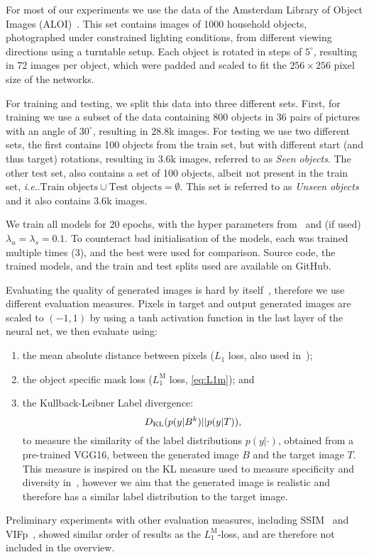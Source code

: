 \documentclass[runningheads]{llncs}
\makeatletter
\DeclareRobustCommand\onedot{\futurelet\@let@token\@onedot}
\def\@onedot{\ifx\@let@token.\else.\null\fi\xspace}
\def\ie{\emph{i.e}\onedot} \def\Ie{\emph{I.e}\onedot}
\def\wmad{$L_1^{\textrm{M}}$\xspace}
\makeatother
\begin{document}
For most of our experiments we use the data of the Amsterdam Library of Object Images (ALOI)~\cite{geusebroek2005amsterdam}.
This set contains images of 1000 household objects, photographed under constrained lighting conditions, from different viewing directions using a turntable setup.
Each object is rotated in steps of $5^\circ$, resulting in 72 images per object, which were padded and scaled to fit the $256\times256$ pixel size of the networks.

For training and testing, we split this data into three different sets.
First, for training we use a subset of the data containing 800 objects in 36 pairs of pictures with an angle of $30^\circ$, resulting in $28.8$k images.
For testing we use two different sets, the first contains 100 objects from the train set, but with different start (and thus target) rotations, resulting in $3.6$k images, referred to as \emph{Seen objects}.
The other test set, also contains a set of 100 objects, albeit not present in the train set, \ie$\text{Train objects} \cup \text{Test objects} = \emptyset$.
This set is referred to as \emph{Unseen objects} and it also contains $3.6$k images.

We train all models for 20 epochs, with the hyper parameters from~\cite{pix2pix2016} and (if used) $\lambda_u = \lambda_s =0.1$.
To counteract bad initialisation of the models, each was trained multiple times (3), and the best were used for comparison.
Source code, the trained models, and the train and test splits used are available on GitHub.

Evaluating the quality of generated images is hard by itself~\cite{wang2002image,salimans16nips}, therefore we use different evaluation measures.
Pixels in target and output generated images are scaled to $(-1,1)$ by using a tanh activation function in the last layer of the neural net, we then evaluate using:
\begin{enumerate}
	\item the mean absolute distance between pixels ($L_1$ loss, also used in~\cite{pix2pix2016});
	\item the object specific mask loss (\wmad loss, \autoref{eq:L1m}); and
	\item the Kullback-Leibner Label divergence:
		\vspace{-2mm}\begin{equation}D_{\textrm{KL}}(p(y|B^k) || p(y|T)),\vspace{-2mm}\end{equation}
		to measure the similarity of the label distributions $p(y|\cdot)$, obtained from a pre-trained VGG16, between the generated image $B$ and the target image $T$. 
		This measure is inspired on the KL measure used to measure specificity and diversity in~\cite{salimans16nips}, however we aim that the generated image is realistic and therefore has a similar label distribution to the target image.
\end{enumerate}
Preliminary experiments with other evaluation measures, including SSIM~\cite{wang2004image} and VIFp~\cite{sheikh2006image}, showed similar order of results as the \wmad-loss, and are therefore not included in the overview.
\end{document}
